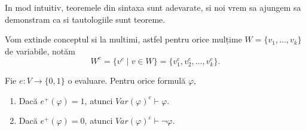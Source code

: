 In mod intuitiv, teoremele din sintaxa sunt adevarate, si noi vrem sa ajungem sa
demonstram ca si tautologiile sunt teoreme.

Vom extinde conceptul si la multimi, astfel pentru orice mulțime \break \( W = \{v_1, \dots, v_k\} \) de variabile, notăm
\[
    W^e = \{v^e \mid v \in W\} = \{v_1^e, v_2^e, \dots, v_k^e\}.
\]


\begin{prop}
    Fie $e : V \to \{0, 1\}$ o evaluare. Pentru orice formulă $\varphi$,
    \begin{enumerate}
        \item[(i)] Dacă $e^+(\varphi) = 1$, atunci $Var(\varphi)^e \vdash \varphi$.
        \item[(ii)] Dacă $e^+(\varphi) = 0$, atunci $Var(\varphi)^e \vdash \neg\varphi$.
    \end{enumerate}
\end{prop}

